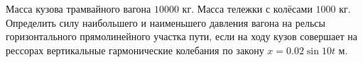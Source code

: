 Масса кузова трамвайного вагона $10000$ кг.
Масса тележки с колёсами $1000$ кг.
Определить силу наибольшего и наименьшего давления вагона
на рельсы горизонтального прямолинейного участка пути,
если на ходу кузов совершает на рессорах вертикальные гармонические колебания
по закону $x = 0.02\sin{10t}$ м.

